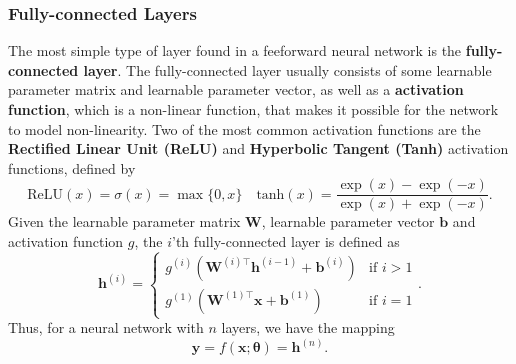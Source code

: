 \documentclass[./main.tex]{subfiles}
\begin{document}
\subsubsection{Fully-connected Layers}
The most simple type of layer found in a feeforward neural network is the \textbf{fully-connected layer}. The fully-connected layer usually consists of some learnable parameter matrix and learnable parameter vector, as well as a \textbf{activation function}, which is a non-linear function, that makes it possible for the network to model non-linearity. Two of the most common activation functions are the \textbf{Rectified Linear Unit (ReLU)} and \textbf{Hyperbolic Tangent (Tanh)} activation functions, defined by
\begin{equation}
    \text{ReLU}(x) = \sigma(x) = \max\{0, x\} \quad \text{tanh}(x) = \frac{\exp(x) - \exp(-x)}{\exp(x) + \exp(-x)}.
\end{equation}
Given the learnable parameter matrix $\bm{W}$, learnable parameter vector $\bm{b}$ and activation function $g$, the $i$'th fully-connected layer is defined as
\begin{equation}
    \bm{h}^{(i)} =
    \begin{cases}
        g^{(i)} \left( \bm{W}^{(i) \top} \bm{h}^{(i - 1)} + \bm{b}^{(i)} \right) & \text{if } i > 1 \\
        g^{(1)} \left( \bm{W}^{(1) \top} \bm{x} + \bm{b}^{(1)} \right) & \text{if } i = 1
    \end{cases}
    .
\end{equation}
Thus, for a neural network with $n$ layers, we have the mapping \cite{DL_book}
\begin{equation}
    \bm{y} = f(\bm{x};\bm{\theta}) = \bm{h}^{(n)}.
\end{equation}
\end{document}
